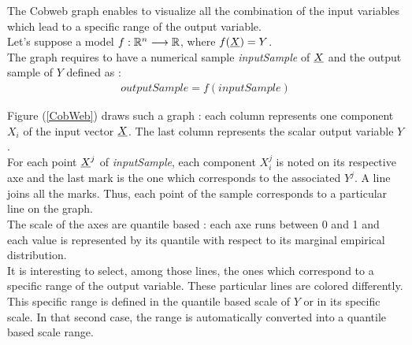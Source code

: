 \renewcommand{\filename}{docUC_CentralUncertainty_CobWebGraph}
\renewcommand{\filetitle}{UC : Sensitivity analysis : Cobweb graph}

\HeaderIIILevel




The Cobweb graph enables to visualize all the combination of the input variables which lead to a specific range of the output variable.\\

Let's suppose a model $f : {\mathbb R}^n \longrightarrow  {\mathbb R}$, where $f({\underline{X}}) = Y$.\\

The graph requires to have a numerical sample \textit{inputSample} of ${\underline{X}}$ and the output sample of $Y$ defined as :
\begin{align*}
  outputSample = f(inputSample)
\end{align*}

Figure (\ref{CobWeb}) draws such a graph : each column represents one component $X_i$ of the input vector ${\underline{X}}$. The last column represents the scalar output variable $Y$.  \\
For each point ${\underline{X}}^j$ of \textit{inputSample}, each component $X_i^j$ is noted on its respective axe and the last mark is the one which corresponds to the associated $Y^j$. A line joins all the marks. Thus, each point of the sample corresponds to a particular line on the graph.\\

The scale of the axes are quantile based :  each axe runs between 0 and 1 and each value is represented by its quantile with respect to its marginal empirical distribution.\\

It is interesting to select, among those lines, the ones which correspond to a specific range of the output variable. These particular lines are colored differently. This specific range is defined in the quantile based scale of $Y$ or in its specific scale. In that second case, the range is automatically converted into a quantile based scale range.\\

